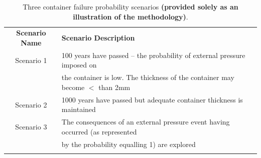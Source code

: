 
\begin{table}[htbp]
\begin{center}
    \begin{tabular}{cl} \Xhline{2\arrayrulewidth}
     \textbf{Scenario Name} & \textbf{Scenario Description} \\ \Xhline{2\arrayrulewidth}
    Scenario 1     & 100 years have passed -- the probability of external pressure imposed on  \\ 
                   & \qquad the container is low. The thickness of the container may become $<$ than 2mm \\\hline
    Scenario 2     & 1000 years have passed but adequate container thickness is maintained \\\hline 
    Scenario 3     & The consequences of an external pressure event having occurred (as represented  \\
                   & \qquad by the probability equalling 1) are explored                                                \\\Xhline{2\arrayrulewidth}
    \end{tabular}
            \small\caption{Three container failure probability scenarios \textbf{(provided solely as an illustration of the methodology)}.}\normalsize
    \label{table:scenarios_description}
    \end{center}
\end{table}
